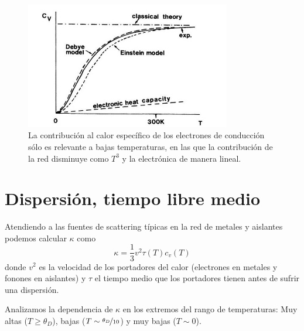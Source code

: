 \begin{figure}
  \centering
  \includegraphics[width=0.8\textwidth]{figures/electronvsphononcv.jpg}
  \caption{La contribución al calor específico de los electrones de
    conducción sólo es relevante a bajas temperaturas, en las que la
    contribución de la red disminuye como $T^3$ y la electrónica de
    manera lineal.}
  \label{fig:electronvsphononcv}
\end{figure}

\section{Dispersión, tiempo libre medio}

Atendiendo a las fuentes de scattering típicas en la red de metales y
aislantes podemos calcular $\kappa$ como
\begin{equation*}
  \kappa = \frac{1}{3} v^2 \tau(T) c_v(T)
\end{equation*}
donde $v^2$ es la velocidad de los portadores del calor (electrones en
metales y fonones en aislantes) y $\tau$ el tiempo medio que los
portadores tienen antes de sufrir una dispersión.

Analizamos la dependencia de $\kappa$ en los extremos del rango de
temperaturas: Muy altas ($T \geq \theta_D$), bajas ($T \sim
\nicefrac{\theta_D}{10}$) y muy bajas ($T \sim 0$).


